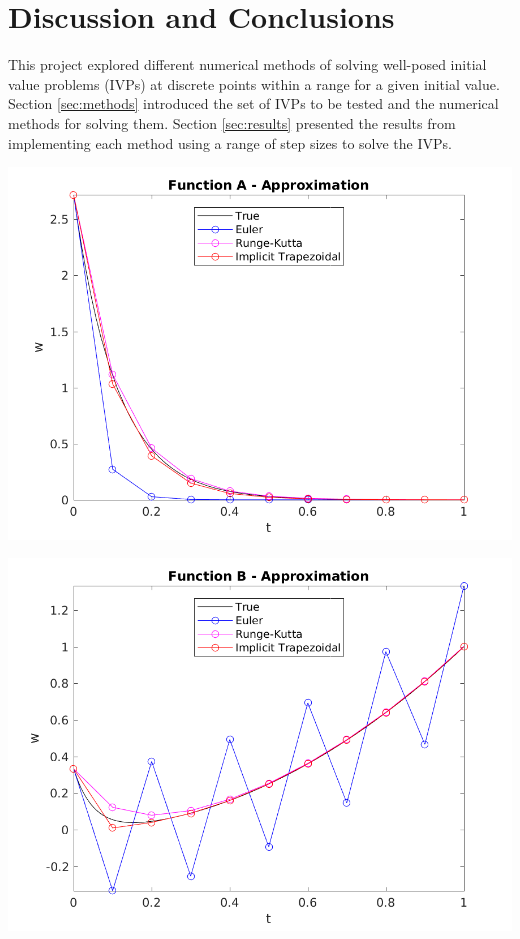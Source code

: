 \documentclass{article}
\begin{document}
\section{Discussion and Conclusions}
\label{sec:conc}

This project explored different numerical methods of solving well-posed initial value problems (IVPs) at discrete points within a range for a given initial value. Section \ref{sec:methods} introduced the set of IVPs to be tested and the numerical methods for solving them. Section \ref{sec:results} presented the results from implementing each method using a range of step sizes to solve the IVPs.


\begin{center}
	\centering
    \begin{minipage}{0.5\textwidth}
        \centering
	    \includegraphics[width=1\textwidth]{../output/a_compare_val.png}
    \end{minipage}\hfill
    \begin{minipage}{0.5\textwidth}
        \centering
	    \includegraphics[width=1\textwidth]{../output/b_compare_val.png}
    \end{minipage}
 	\label{fig:compare_val}
\end{center}
\end{document}
